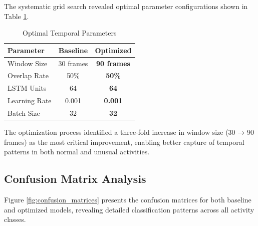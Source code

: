 \documentclass{iopconfser}
\begin{document}
The systematic grid search revealed optimal parameter configurations shown in Table \ref{tab:optimal_params}.

\begin{table}[H]
\centering
\caption{Optimal Temporal Parameters}
\label{tab:optimal_params}
\begin{tabular}{lcc}
\toprule
\textbf{Parameter} & \textbf{Baseline} & \textbf{Optimized} \\
\midrule
Window Size & 30 frames & \textbf{90 frames} \\
Overlap Rate & 50\% & \textbf{50\%} \\
LSTM Units & 64 & \textbf{64} \\
Learning Rate & 0.001 & \textbf{0.001} \\
Batch Size & 32 & \textbf{32} \\
\bottomrule
\end{tabular}
\end{table}

The optimization process identified a three-fold increase in window size (30 → 90 frames) as the most critical improvement, enabling better capture of temporal patterns in both normal and unusual activities.

\subsection{Confusion Matrix Analysis}

Figure \ref{fig:confusion_matrices} presents the confusion matrices for both baseline and optimized models, revealing detailed classification patterns across all activity classes.
\end{document}

